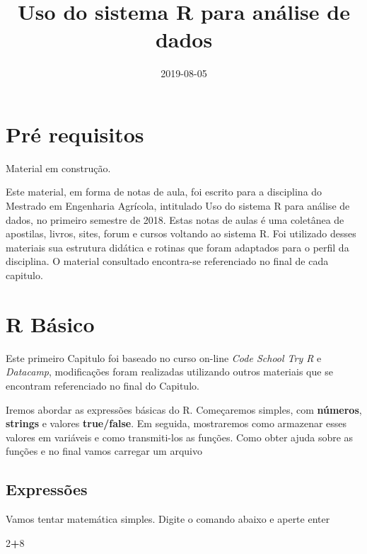\documentclass[]{book}
\title{Uso do sistema R para análise de dados}
\author{}
\date{2019-08-05}
\newenvironment{Shaded}{\begin{snugshade}}{\end{snugshade}}
\newcommand{\DecValTok}[1]{\textcolor[rgb]{0.00,0.00,0.81}{#1}}
\newcommand{\OperatorTok}[1]{\textcolor[rgb]{0.81,0.36,0.00}{\textbf{#1}}}
\begin{document}
\maketitle

{
\setcounter{tocdepth}{1}
\tableofcontents
}
\hypertarget{pre-requisitos}{%
\chapter{Pré requisitos}\label{pre-requisitos}}

Material em construção.

Este material, em forma de notas de aula, foi escrito para a disciplina do Mestrado em Engenharia Agrícola, intitulado Uso do sistema R para análise de dados, no primeiro semestre de 2018.
Estas notas de aulas é uma coletânea de apostilas, livros, sites, forum e cursos voltando ao sistema R. Foi utilizado desses materiais sua estrutura didática e rotinas que foram adaptados para o perfil da disciplina.
O material consultado encontra-se referenciado no final de cada capitulo.

\hypertarget{intro}{%
\chapter{R Básico}\label{intro}}

Este primeiro Capitulo foi baseado no curso on-line \emph{Code School Try R} e \emph{Datacamp}, modificações foram realizadas utilizando outros materiais que se encontram referenciado no final do Capitulo.

Iremos abordar as expressões básicas do R.
Começaremos simples, com \textbf{números}, \textbf{strings} e valores \textbf{true/false}. Em seguida, mostraremos como armazenar esses valores em variáveis e como transmiti-los as funções. Como obter ajuda sobre as funções e no final vamos carregar um arquivo

\hypertarget{expressoes}{%
\section{Expressões}\label{expressoes}}

Vamos tentar matemática simples. Digite o comando abaixo e aperte enter

\begin{Shaded}
\begin{Highlighting}[]
\DecValTok{2}\OperatorTok{+}\DecValTok{8}
\end{Highlighting}
\end{Shaded}
\end{document}
